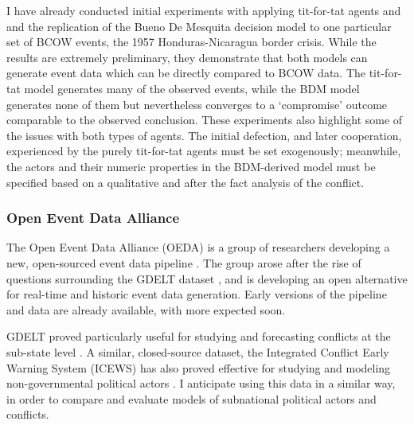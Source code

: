 I have already conducted initial experiments with applying tit-for-tat agents and and the \citet{scholz_2011} replication of the Bueno De Mesquita decision model to one particular set of BCOW events, the 1957 Honduras-Nicaragua border crisis. While the results are extremely preliminary, they demonstrate that both models can generate event data which can be directly compared to BCOW data. The tit-for-tat model generates many of the observed events, while the BDM model generates none of them but nevertheless converges to a `compromise' outcome comparable to the observed conclusion. These experiments also highlight some of the issues with both types of agents. The initial defection, and later cooperation, experienced by the purely tit-for-tat agents must be set exogenously; meanwhile, the actors and their numeric properties in the BDM-derived model must be specified based on a qualitative and after the fact analysis of the conflict.

\subsubsection{Open Event Data Alliance}\label{open-event-data-alliance}

The Open Event Data Alliance (OEDA) is a group of researchers developing a new, open-sourced event data pipeline \citep{schrodt_2014}. The group arose after the rise of questions surrounding the GDELT dataset \citep{nexon_2014}, and is developing an open alternative for real-time and historic event data generation. Early versions of the pipeline and data are already available, with more expected soon.

GDELT proved particularly useful for studying and forecasting conflicts at the sub-state level \citep{masad_2013,yonamine_2013}. A similar, closed-source dataset, the Integrated Conflict Early Warning System (ICEWS) has also proved effective for studying and modeling non-governmental political actors \citep{metternich_2013}. I anticipate using this data in a similar way, in order to compare and evaluate models of subnational political actors and conflicts.

